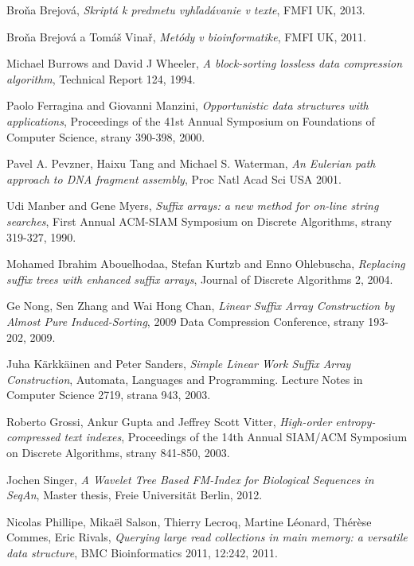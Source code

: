 \begin{thebibliography}{99}
 
        Broňa Brejová,
        \emph{Skriptá k predmetu vyhľadávanie v texte},
        FMFI UK,
        2013.
        
        Broňa Brejová a Tomáš Vinař,
        \emph{Metódy v bioinformatike},
        FMFI UK,
        2011.
        
        Michael Burrows and David J Wheeler,
        \emph{A block-sorting lossless data compression algorithm},     
        Technical Report 124,
        1994.
        
        Paolo Ferragina and Giovanni Manzini,
        \emph{Opportunistic data structures with applications},
        Proceedings of the 41st Annual Symposium on Foundations of Computer
        Science, strany 390-398,
        2000.
        
        Pavel A. Pevzner, Haixu Tang and Michael S. Waterman,
        \emph{An Eulerian path approach to DNA fragment assembly},
        Proc Natl Acad Sci USA
        2001.
        
        Udi Manber and Gene Myers,
        \emph{Suffix arrays: a new method for on-line string searches},
        First Annual ACM-SIAM Symposium on Discrete Algorithms, strany 319-327,
        1990.
        
        Mohamed Ibrahim Abouelhodaa, Stefan Kurtzb and Enno Ohlebuscha,
        \emph{Replacing suffix trees with enhanced suffix arrays},
        Journal of Discrete Algorithms 2,
        2004.
        
        Ge Nong, Sen Zhang and Wai Hong Chan,
        \emph{Linear Suffix Array Construction by Almost Pure Induced-Sorting},
        2009 Data Compression Conference, strany 193-202,
        2009.
        
        Juha Kärkkäinen and Peter Sanders,
        \emph{Simple Linear Work Suffix Array Construction},
        Automata, Languages and Programming. Lecture Notes in Computer Science
        2719, strana 943,
        2003.
        
        Roberto Grossi, Ankur Gupta and Jeffrey Scott Vitter,
        \emph{High-order entropy-compressed text indexes},
        Proceedings of the 14th Annual SIAM/ACM Symposium on Discrete Algorithms, strany 841-850,
        2003.
        
        Jochen Singer,
        \emph{A Wavelet Tree Based FM-Index for Biological Sequences in SeqAn},
        Master thesis,
        Freie Universit\"{a}t Berlin,
        2012.
        
        Nicolas Phillipe, Mika\"{e}l Salson, Thierry Lecroq, Martine Léonard, Thér\`{e}se Commes, Eric Rivals,
        \emph{Querying large read collections in main memory: a versatile data structure},
        BMC Bioinformatics 2011, 12:242,
        2011.

\end{thebibliography}
